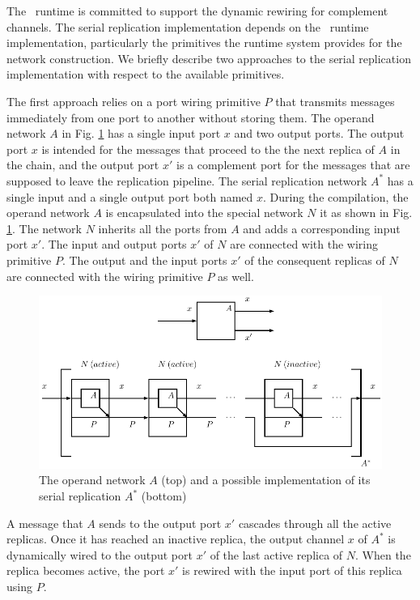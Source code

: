 The \ak\ runtime is committed to support the dynamic rewiring for complement channels. The serial replication implementation depends on the \ak\ runtime implementation, particularly the primitives the runtime system provides for the network construction. We briefly describe two approaches to the serial replication implementation with respect to the available primitives.


The first approach relies on a port wiring primitive $P$ that transmits messages immediately from one port to another without storing them. The operand network $A$ in Fig. \ref{fig:ffp_new} has a single input port $x$ and two output ports. The output port $x$ is intended for the messages that proceed to the the next replica of $A$ in the chain, and the output port $x'$ is a complement port for the messages that are supposed to leave the replication pipeline. The serial replication network $A^{*}$ has a single input and a single output port both named $x$. During the compilation, the operand network $A$ is encapsulated into the special network $N$ it as shown in Fig. \ref{fig:ffp_new}. The network $N$ inherits all the ports from $A$ and adds a corresponding input port $x'$. The input and output ports $x'$ of $N$ are connected with the wiring primitive $P$. The output and the input ports $x'$ of the consequent replicas of $N$ are connected with the wiring primitive $P$ as well.
\begin{figure}[h!]
\centering
\includegraphics[scale=0.8]{figs/chapter_04_ffp_new.pdf}
\caption{The operand network $A$ (top) and a possible implementation of its serial replication $A^{*}$ (bottom)}
\label{fig:ffp_new}
\end{figure}
A message that $A$ sends to the output port $x'$ cascades through all the active replicas. Once it has reached an inactive replica, the output channel $x$ of $A^{*}$ is dynamically wired to the output port $x'$ of the last active replica of $N$. When the replica becomes active, the port $x'$ is rewired with the input port of this replica using $P$.

